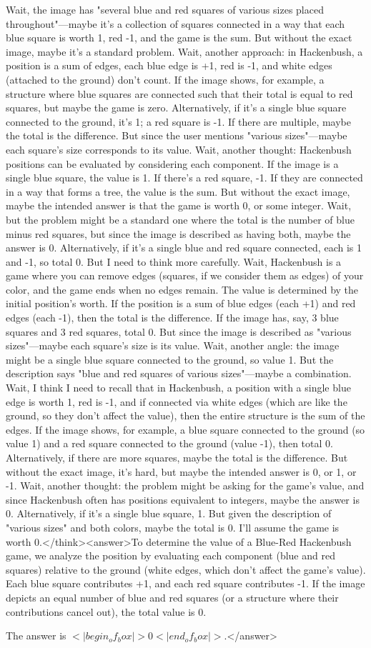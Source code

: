 Wait, the image has "several blue and red squares of various sizes placed throughout"—maybe it's a collection of squares connected in a way that each blue square is worth 1, red -1, and the game is the sum. But without the exact image, maybe it's a standard problem. Wait, another approach: in Hackenbush, a position is a sum of edges, each blue edge is +1, red is -1, and white edges (attached to the ground) don't count. If the image shows, for example, a structure where blue squares are connected such that their total is equal to red squares, but maybe the game is zero. Alternatively, if it's a single blue square connected to the ground, it's 1; a red square is -1. If there are multiple, maybe the total is the difference. But since the user mentions "various sizes"—maybe each square's size corresponds to its value. Wait, another thought: Hackenbush positions can be evaluated by considering each component. If the image is a single blue square, the value is 1. If there's a red square, -1. If they are connected in a way that forms a tree, the value is the sum. But without the exact image, maybe the intended answer is that the game is worth 0, or some integer. Wait, but the problem might be a standard one where the total is the number of blue minus red squares, but since the image is described as having both, maybe the answer is 0. Alternatively, if it's a single blue and red square connected, each is 1 and -1, so total 0. But I need to think more carefully. Wait, Hackenbush is a game where you can remove edges (squares, if we consider them as edges) of your color, and the game ends when no edges remain. The value is determined by the initial position's worth. If the position is a sum of blue edges (each +1) and red edges (each -1), then the total is the difference. If the image has, say, 3 blue squares and 3 red squares, total 0. But since the image is described as "various sizes"—maybe each square's size is its value. Wait, another angle: the image might be a single blue square connected to the ground, so value 1. But the description says "blue and red squares of various sizes"—maybe a combination. Wait, I think I need to recall that in Hackenbush, a position with a single blue edge is worth 1, red is -1, and if connected via white edges (which are like the ground, so they don't affect the value), then the entire structure is the sum of the edges. If the image shows, for example, a blue square connected to the ground (so value 1) and a red square connected to the ground (value -1), then total 0. Alternatively, if there are more squares, maybe the total is the difference. But without the exact image, it's hard, but maybe the intended answer is 0, or 1, or -1. Wait, another thought: the problem might be asking for the game's value, and since Hackenbush often has positions equivalent to integers, maybe the answer is 0. Alternatively, if it's a single blue square, 1. But given the description of "various sizes" and both colors, maybe the total is 0. I'll assume the game is worth 0.</think><answer>To determine the value of a Blue-Red Hackenbush game, we analyze the position by evaluating each component (blue and red squares) relative to the ground (white edges, which don't affect the game's value). Each blue square contributes +1, and each red square contributes -1. If the image depicts an equal number of blue and red squares (or a structure where their contributions cancel out), the total value is 0.  

The answer is \(<|begin_of_box|>0<|end_of_box|>\).</answer>